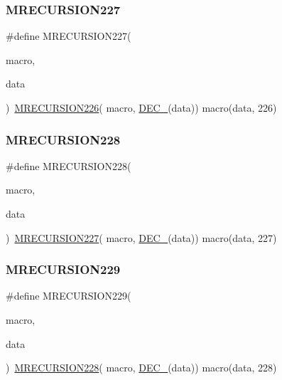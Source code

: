 \subsubsection{\texorpdfstring{MRECURSION227}{MRECURSION227}}
{\footnotesize\ttfamily \#define M\+R\+E\+C\+U\+R\+S\+I\+O\+N227(\begin{DoxyParamCaption}\item[{}]{macro,  }\item[{}]{data }\end{DoxyParamCaption})~\mbox{\hyperlink{group__group__sam0__utils__mrecursion_ga98d3f68511230e8b1e541db7cd93f59d}{M\+R\+E\+C\+U\+R\+S\+I\+O\+N226}}(  macro, \mbox{\hyperlink{group__group__sam0__utils__mrecursion_ga1d23d683797679dca8c3512a54a5dcae}{D\+E\+C\+\_\+}}(data))   macro(data, 226)}

\mbox{\label{group__group__sam0__utils__mrecursion_ga47235a08705017eeeaef3b229f9c92db}} 
\subsubsection{\texorpdfstring{MRECURSION228}{MRECURSION228}}
{\footnotesize\ttfamily \#define M\+R\+E\+C\+U\+R\+S\+I\+O\+N228(\begin{DoxyParamCaption}\item[{}]{macro,  }\item[{}]{data }\end{DoxyParamCaption})~\mbox{\hyperlink{group__group__sam0__utils__mrecursion_ga45b814bc93f1a82ae4f18566beedb453}{M\+R\+E\+C\+U\+R\+S\+I\+O\+N227}}(  macro, \mbox{\hyperlink{group__group__sam0__utils__mrecursion_ga1d23d683797679dca8c3512a54a5dcae}{D\+E\+C\+\_\+}}(data))   macro(data, 227)}

\mbox{\label{group__group__sam0__utils__mrecursion_gaec897a7f62aa5fef50018148adf089bb}} 
\subsubsection{\texorpdfstring{MRECURSION229}{MRECURSION229}}
{\footnotesize\ttfamily \#define M\+R\+E\+C\+U\+R\+S\+I\+O\+N229(\begin{DoxyParamCaption}\item[{}]{macro,  }\item[{}]{data }\end{DoxyParamCaption})~\mbox{\hyperlink{group__group__sam0__utils__mrecursion_ga47235a08705017eeeaef3b229f9c92db}{M\+R\+E\+C\+U\+R\+S\+I\+O\+N228}}(  macro, \mbox{\hyperlink{group__group__sam0__utils__mrecursion_ga1d23d683797679dca8c3512a54a5dcae}{D\+E\+C\+\_\+}}(data))   macro(data, 228)}

